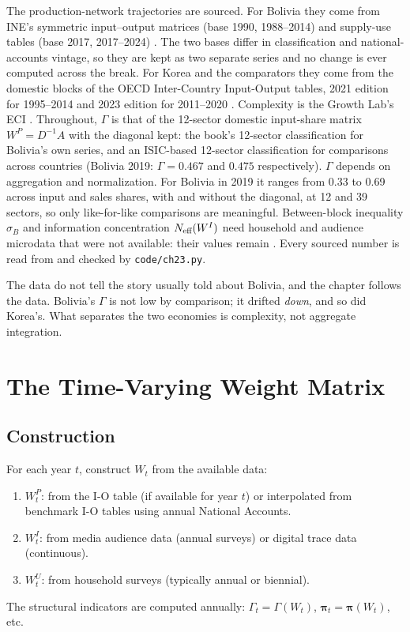 \documentclass[../structural_economics_book.tex]{subfiles}
\begin{document}
The production-network trajectories are sourced. For Bolivia they come from INE's symmetric input--output matrices (base 1990, 1988--2014) and supply-use tables (base 2017, 2017--2024) \citep{ine2026sut}. The two bases differ in classification and national-accounts vintage, so they are kept as two separate series and no change is ever computed across the break. For Korea and the comparators they come from the domestic blocks of the OECD Inter-Country Input-Output tables, 2021 edition for 1995--2014 and 2023 edition for 2011--2020 \citep{oecd2021icio,oecd2023icio}. Complexity is the Growth Lab's ECI \citep{growthlab2026atlas}. Throughout, $\Gamma$ is that of the 12-sector domestic input-share matrix $W^P = D^{-1}A$ with the diagonal kept: the book's 12-sector classification for Bolivia's own series, and an ISIC-based 12-sector classification for comparisons across countries (Bolivia 2019: $\Gamma = 0.467$ and $0.475$ respectively). $\Gamma$ depends on aggregation and normalization. For Bolivia in 2019 it ranges from 0.33 to 0.69 across input and sales shares, with and without the diagonal, at 12 and 39 sectors, so only like-for-like comparisons are meaningful. Between-block inequality $\sigma_B$ and information concentration $N_{\text{eff}}(W^I)$ need household and audience microdata that were not available: their values remain \illustrative. Every sourced number is read from  and checked by \texttt{code/ch23.py}.

The data do not tell the story usually told about Bolivia, and the chapter follows the data. Bolivia's $\Gamma$ is not low by comparison; it drifted \emph{down}, and so did Korea's. What separates the two economies is complexity, not aggregate integration.


\section{The Time-Varying Weight Matrix}
\label{ch23:sec:time_varying}

\subsection{Construction}

\begin{definition}\label{ch23:def:Wt}
For each year $t$, construct $W_t$ from the available data:
\begin{enumerate}
\item $W^P_t$: from the I-O table (if available for year $t$) or interpolated from benchmark I-O tables using annual National Accounts.
\item $W^I_t$: from media audience data (annual surveys) or digital trace data (continuous).
\item $W^U_t$: from household surveys (typically annual or biennial).
\end{enumerate}
The structural indicators are computed annually: $\Gamma_t = \Gamma(W_t)$, $\boldsymbol{\pi}_t = \boldsymbol{\pi}(W_t)$, etc.
\end{definition}
\end{document}
